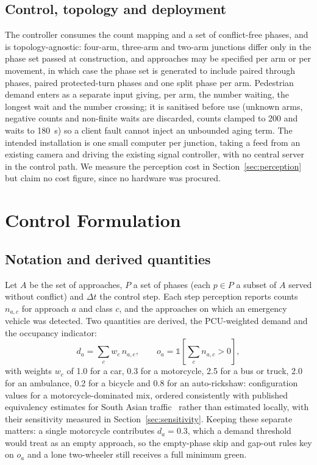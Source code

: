 \documentclass[journal]{IEEEtran}
\newcommand{\pcu}{PCU}
\begin{document}
\subsection{Control, topology and deployment}

The controller consumes the count mapping and a set of conflict-free phases, and is topology-agnostic: four-arm,
three-arm and two-arm junctions differ only in the phase set passed at construction, and approaches may be
specified per arm or per movement, in which case the phase set is generated to include paired through phases,
paired protected-turn phases and one split phase per arm. Pedestrian demand enters as a separate input giving,
per arm, the number waiting, the longest wait and the number crossing; it is sanitised before use (unknown
arms, negative counts and non-finite waits are discarded, counts clamped to 200 and waits to 180~s) so a
client fault cannot inject an unbounded aging term. The intended installation is one small computer per
junction, taking a feed from an existing camera and driving the existing signal controller, with no central
server in the control path. We measure the perception cost in Section~\ref{sec:perception} but claim no cost
figure, since no hardware was procured.

\section{Control Formulation}
\label{sec:control}

\subsection{Notation and derived quantities}

Let $A$ be the set of approaches, $P$ a set of phases (each $p \in P$ a subset of $A$ served without
conflict) and $\Delta t$ the control step. Each step perception reports counts $n_{a,c}$ for approach $a$
and class $c$, and the approaches on which an emergency vehicle was detected. Two quantities are derived, the
\pcu-weighted demand and the occupancy indicator:
\begin{equation}
d_a = \sum_{c} w_c \, n_{a,c}, \qquad o_a = \mathbb{1}\!\left[\textstyle\sum_c n_{a,c} > 0\right],
\label{eq:demand}
\end{equation}
with weights $w_c$ of 1.0 for a car, 0.3 for a motorcycle, 2.5 for a bus or truck, 2.0 for an ambulance, 0.2
for a bicycle and 0.8 for an auto-rickshaw: configuration values for a motorcycle-dominated mix, ordered
consistently with published equivalency estimates for South Asian
traffic~\cite{chandra2003effect,arasan2010microsimulation} rather than estimated locally, with their
sensitivity measured in Section~\ref{sec:sensitivity}. Keeping these separate matters: a single motorcycle contributes
$d_a = 0.3$, which a demand threshold would treat as an empty approach, so the empty-phase skip and gap-out
rules key on $o_a$ and a lone two-wheeler still receives a full minimum green.
\end{document}
